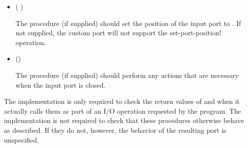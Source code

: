 \begin{entry}{%
}
\begin{itemize}
\item {\cf ( )}
       
  The  procedure (if supplied) should set the
  position of the input port to .  If not supplied, the custom
  port will not support the {\cf set-port-position!} operation.
       
\item {\cf ()}
       
  The  procedure (if supplied) should perform any actions
  that are necessary when the input port is closed.
\end{itemize}

\implresp The implementation is only required to check the return
values of  and  when it actually calls
them as part of an I/O operation requested by the program.  The
implementation is not required to check that these procedures
otherwise behave as described.  If they do not, however, the behavior
of the resulting port is unspecified.
\end{entry}

